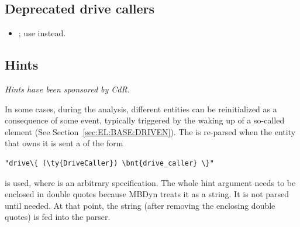 \subsection{Deprecated drive callers}
\begin{itemize}
\item {}; use  instead.
\end{itemize}








\subsection{Hints}\label{sec:GENERAL:DRIVE:HINT}
\emph{Hints have been sponsored
by  CdR.}
\bigskip

In some cases, during the analysis, different entities can be reinitialized
as a consequence of some event, typically triggered by the waking up 
of a so-called  element (See Section~\ref{sec:EL:BASE:DRIVEN}).
The  is re-parsed when the entity that owns it is sent
a  of the form
\begin{Verbatim}[commandchars=\\\{\}]
    "drive\{ (\ty{DriveCaller}) \bnt{drive_caller} \}"
\end{Verbatim}
is used, where  is an arbitrary 
specification.
The whole hint argument needs to be enclosed in double quotes because MBDyn
treats it as a string.
It is not parsed until needed.
At that point, the string (after removing the enclosing double quotes)
is fed into the parser.

